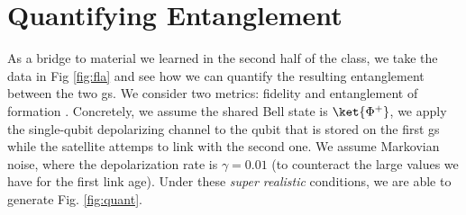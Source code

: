 \section{Quantifying Entanglement}

As a bridge to material we learned in the second half of the class, we take the data in Fig \ref{fig:fla} and see how we can quantify the resulting entanglement between the two gs. We consider two metrics: fidelity and entanglement of formation \cite{wootters1998}. Concretely, we assume the shared Bell state is \(\ket{\Phi^+}\), we apply the single-qubit depolarizing channel to the qubit that is stored on the first gs while the satellite attemps to link with the second one. We assume Markovian \cite{brand2024} noise, where the depolarization rate is \(\gamma = 0.01\) (to counteract the large values we have for the first link age). Under these \textit{super realistic} conditions, we are able to generate Fig. \ref{fig:quant}.


